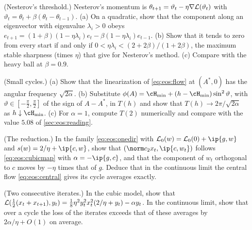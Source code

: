 \begin{refsection}
\begin{exercises}
\item \consolidation (Nesterov's threshold.) Nesterov's momentum is $\theta_{t+1}=\vartheta_t-\eta\nabla\mathcal{L}(\vartheta_t)$ with $\vartheta_t=\theta_t+\beta(\theta_t-\theta_{t-1})$. (a) On a quadratic, show that the component along an eigenvector with eigenvalue $\lambda_i>0$ obeys $e_{t+1}=(1+\beta)(1-\eta\lambda_i)e_t-\beta(1-\eta\lambda_i)e_{t-1}$. (b) Show that it tends to zero from every start if and only if $0<\eta\lambda_i<(2+2\beta)/(1+2\beta)$, the maximum stable sharpness (times $\eta$) that \textcite{CohenEtAl2021} give for Nesterov's method. (c) Compare with the heavy ball at $\beta=0.9$.\label{ex:eos:nesterov}

\item \consolidation (Small cycles.) (a) Show that the linearization of \eqref{eq:eos:flow} at $(A^*,0)$ has the angular frequency $\sqrt{2\alpha}$. (b) Substitute $\phi(A)=\eosHmin+(h-\eosHmin)\sin^2\vartheta$, with $\vartheta\in[-\frac\pi2,\frac\pi2]$ of the sign of $A-A^*$, in $T(h)$ and show that $T(h)\to2\pi/\sqrt{2\alpha}$ as $h\downarrow\eosHmin$. (c) For $\alpha=1$, compute $T(2)$ numerically and compare with the value $5.08$ of \cref{sec:eos:reading}.\label{ex:eos:period}

\item \consolidation (The reduction.) In the family \eqref{eq:eos:onedir} with $\Loss_0(w)=\Loss_0(0)+\ip{g,w}$ and $s(w)=2/\eta+\ip{c,w}$, show that $(\norm c_2x_t,\ip{c,w_t})$ follows \eqref{eq:eos:cubicmap} with $\alpha=-\ip{g,c}$, and that the component of $w_t$ orthogonal to $c$ moves by $-\eta$ times that of $g$. Deduce that in the continuous limit the central flow \eqref{eq:eos:central} gives its cycle averages exactly.\label{ex:eos:reduction}

\item \consolidation (Two consecutive iterates.) In the cubic model, show that $\mathcal{L}(\frac12(x_t+x_{t+1}),y_t)=\frac18\eta^2y_t^2x_t^2(2/\eta+y_t)-\alpha y_t$. In the continuous limit, show that over a cycle the loss of the iterates exceeds that of these averages by $2\alpha/\eta+O(1)$ on average.\label{ex:eos:average}


\end{exercises}
\end{refsection}
